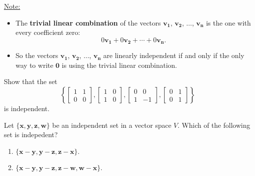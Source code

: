 \documentclass[20pt,a4paper]{extarticle}
\newcounter{example}
\begin{document}
\underline{Note:} 
\begin{itemize}
	\item The \textbf{trivial linear combination} of the vectors $\mathbf{v_1}$, $\mathbf{v_2}$, $\ldots$, $\mathbf{v_n}$ is the one with every coefficient zero:
	\[
		0 \mathbf{v_1} + 0 \mathbf{v_2} + \cdots + 0 \mathbf{v_n} .
	\]
	\item So the vectors $\mathbf{v_1}$, $\mathbf{v_2}$, $\ldots$, $\mathbf{v_n}$ are linearly independent if and only if the only way to write $\mathbf{0}$ is using the trivial linear combination.
\end{itemize}

\begin{example}
Show that the set
	\[
		\left\{ \begin{bmatrix} 1 & 1 \\ 0 & 0 \end{bmatrix} , \begin{bmatrix} 1 & 0 \\ 1 & 0 \end{bmatrix} , \begin{bmatrix} 0 & 0 \\ 1 & -1 \end{bmatrix} , \begin{bmatrix} 0 & 1 \\ 0 & 1 \end{bmatrix} \right\} 
	\]
is independent.
\end{example}

\begin{solution}

\end{solution}

\newpage 

\phantom{2} 

\newpage 

\begin{example} 
Let $\{ \mathbf{x} , \mathbf{y} , \mathbf{z} , \mathbf{w} \}$ be an independent set in a vector space $V$. Which of the following set is indepedent?
	\begin{enumerate}[label=\alph*)]
		\item $\{ \mathbf{x} - \mathbf{y} , \mathbf{y} - \mathbf{z} , \mathbf{z} - \mathbf{x} \}$.
		\item $\{ \mathbf{x} - \mathbf{y} , \mathbf{y} - \mathbf{z} , \mathbf{z} - \mathbf{w} , \mathbf{w} - \mathbf{x} \}$.
	\end{enumerate}
\end{example} 
\end{document}
